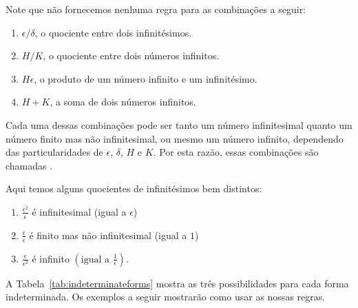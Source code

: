 Note que não fornecemos nenhuma regra para as combinações a seguir:
\begin{enumerate}[\hspace{4ex}]
\item $\epsilon/\delta$, o quociente entre dois infinitésimos.
\item $H/K$, o quociente entre dois números infinitos.
\item $H\epsilon$, o produto de um número infinito e um infinitésimo.
\item $H+K$, a soma de dois números infinitos.
\end{enumerate}
Cada uma dessas combinações pode ser tanto um número infinitesimal quanto
um número finito mas não infinitesimal, ou mesmo um número infinito,
dependendo das particularidades de $\epsilon$, $\delta$, $H$ e $K$. Por
esta razão, essas combinações são chamadas .

Aqui temos alguns quocientes de infinitésimos bem distintos:
\begin{enumerate}[\hspace{4ex}]
\item $\displaystyle \frac{\epsilon^2}{\epsilon}$ é infinitesimal (igual a $\epsilon$)\\[0.5ex]
\item $\displaystyle \frac{\epsilon}{\epsilon}$ é finito mas não infinitesimal (igual a $1$)\\[0.5ex]
\item $\displaystyle \frac{\epsilon}{\epsilon^2}$ é infinito $\displaystyle \left(\text{igual a }\frac{1}{\epsilon}\right)$.
\end{enumerate}

A Tabela~\ref{tab:indeterminateforms} mostra as três possibilidades para cada
forma indeterminada. Os exemplos a seguir mostrarão como usar as nossas regras.

